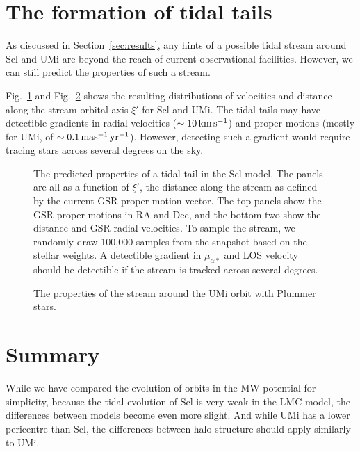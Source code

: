 \section{The formation of tidal
tails}\label{the-formation-of-tidal-tails}

As discussed in Section~\ref{sec:results}, any hints of a possible tidal
stream around Scl and UMi are beyond the reach of current observational
facilities. However, we can still predict the properties of such a
stream.

Fig.~\ref{fig:scl_tidal_stream} and Fig.~\ref{fig:umi_tidal_stream}
shows the resulting distributions of velocities and distance along the
stream orbital axis \(\xi'\) for Scl and UMi. The tidal tails may have
detectible gradients in radial velocities (\(\sim 10\,{\rm km\,s^{-1}}\)) and proper
motions (mostly for UMi, of \(\sim 0.1\,{\rm mas^{-1}\,yr^{-1}}\)). However, detecting
such a gradient would require tracing stars across several degrees on
the sky.

\begin{figure}
\centering
{}
\caption[Sculptor predicted stream]{The predicted properties of a tidal
tail in the Scl model. The panels are all as a function of \(\xi'\), the
distance along the stream as defined by the current GSR proper motion
vector. The top panels show the GSR proper motions in RA and Dec, and
the bottom two show the distance and GSR radial velocities. To sample
the stream, we randomly draw 100,000 samples from the snapshot based on
the stellar weights. A detectible gradient in \(\mu_{\alpha*}\) and LOS
velocity should be detectible if the stream is tracked across several
degrees.}\label{fig:scl_tidal_stream}
\end{figure}

\begin{figure}
\centering
{}
\caption[Ursa Minor predicted stream]{The properties of the stream
around the UMi \smallperi{} orbit with Plummer
stars.}\label{fig:umi_tidal_stream}
\end{figure}

\section{Summary}\label{summary}

While we have compared the evolution of orbits in the MW potential for
simplicity, because the tidal evolution of Scl is very weak in the LMC
model, the differences between models become even more slight. And while
UMi has a lower pericentre than Scl, the differences between halo
structure should apply similarly to UMi.
